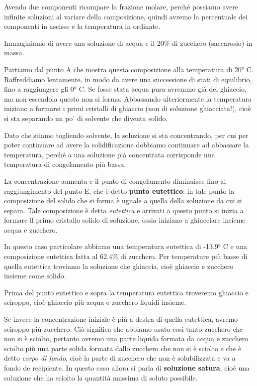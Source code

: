 Avendo due componenti ricompare la frazione molare, perché possiamo avere infinite soluzioni al variare della composizione, quindi avremo la percentuale dei componenti in ascisse e la temperatura in ordinate.

Immaginiamo di avere una soluzione di acqua e il 20\% di zucchero (saccarosio) in massa.

Partiamo dal punto A che mostra questa composizione alla temperatura di 20° C. Raffreddiamo lentamente, in modo da avere una successione di stati di equilibrio, fino a raggiungere gli 0° C. Se fosse stata acqua pura avremmo già del ghiaccio, ma non essendola questo non si forma. Abbassando ulteriormente la temperatura iniziano a formarsi i primi cristalli di ghiaccio (non di soluzione ghiacciata!), cioè si sta separando un po' di solvente che diventa solido.

Dato che stiamo togliendo solvente, la soluzione si sta concentrando, per cui per poter continuare ad avere la solidificazione dobbiamo continuare ad abbassare la temperatura, perché a una soluzione pià concentrata corrisponde una temperatura di congelamento più bassa.

La concentrazione aumenta e il punto di congelamento diminuisce fino al raggiungimento del punto E, che è detto \textbf{punto eutettico}: in tale punto la composizione del solido che si forma è uguale a quella della soluzione da cui si separa. Tale composizione è detta \textit{eutettica} e arrivati a questo punto si inizia a formare il primo cristallo solido di soluzione, ossia iniziano a ghiacciare insieme acqua e zucchero.

In questo caso particolare abbiamo una temperatura eutettica di -13.9° C e una composizione eutettica fatta al 62.4\% di zucchero. Per temperature più basse di quella eutettica troviamo la soluzione che ghiaccia, cioè ghiaccio e zucchero insieme come solido.

Prima del punto eutettico e sopra la temperatura eutettica troveremo ghiaccio e sciroppo, cioè ghiaccio più acqua e zucchero liquidi insieme.

Se invece la concentrazione iniziale è più a destra di quella eutettica, avremo sciroppo più zucchero. Ciò significa che abbiamo usato così tanto zucchero che non si è sciolto, pertanto avremo una parte liquida formata da acqua e zucchero sciolto più una parte solida formata dallo zucchero che non si è sciolto e che è detto \textit{corpo di fondo}, cioè la parte di zucchero che non è solubilizzata e va a fondo de recipiente. In questo caso allora si parla di \textbf{soluzione satura}, cioè una soluzione che ha sciolto la quantità massima di soluto possibile.

